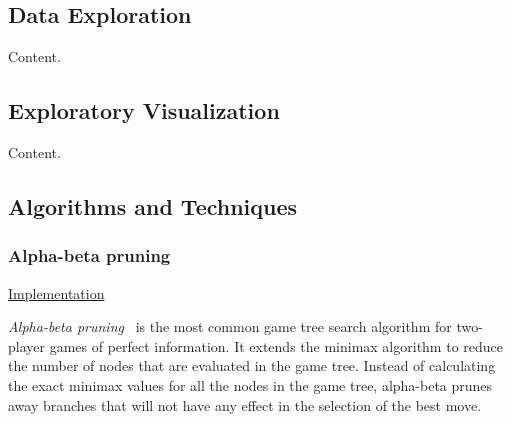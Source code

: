 \documentclass{article}
\begin{document}
\subsection{Data Exploration}

Content.

\subsection{Exploratory Visualization}

Content.

\subsection{Algorithms and Techniques}

\subsubsection{Alpha-beta pruning}

\noindent
\href{https://github.com/davidrobles/mlnd-capstone-code/blob/master/capstone/player/alphabeta.py}
     {Implementation}
\break


\emph{Alpha-beta pruning}~\citep{Knuth1975AB} is the most common game tree search algorithm for
two-player games of perfect information. It extends the minimax algorithm to reduce the number of
nodes that are evaluated in the game tree. Instead of calculating the exact minimax values for all
the nodes in the game tree, alpha-beta prunes away branches that will not have any effect in the
selection of the best move.

\end{document}
